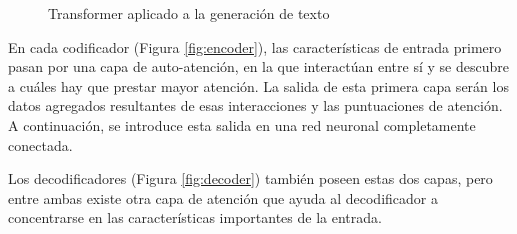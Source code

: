 \begin{figure}[H]
\centering
    \caption{Transformer aplicado a la generación de texto \cite{transformers}}
    \label{fig:transformer}
\end{figure}

En cada codificador (Figura \ref{fig:encoder}), las características de entrada primero pasan por una capa de auto-atención, en la que interactúan entre sí y se descubre a cuáles hay que prestar mayor atención. La salida de esta primera capa serán los datos agregados resultantes de esas interacciones y las puntuaciones de atención. A continuación, se introduce esta salida en una red neuronal completamente conectada. \cite{self-attention}

Los decodificadores (Figura \ref{fig:decoder}) también poseen estas dos capas, pero entre ambas existe otra capa de atención que ayuda al decodificador a concentrarse en las características importantes de la entrada.

